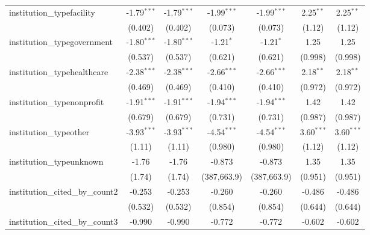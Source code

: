 \begin{tabular}{lcccccc}
   institution\_typefacility             & -1.79$^{***}$ & -1.79$^{***}$ & -1.99$^{***}$ & -1.99$^{***}$ & 2.25$^{**}$   & 2.25$^{**}$\\   
                                         & (0.402)       & (0.402)       & (0.073)       & (0.073)       & (1.12)        & (1.12)\\   
   institution\_typegovernment           & -1.80$^{***}$ & -1.80$^{***}$ & -1.21$^{*}$   & -1.21$^{*}$   & 1.25          & 1.25\\   
                                         & (0.537)       & (0.537)       & (0.621)       & (0.621)       & (0.998)       & (0.998)\\   
   institution\_typehealthcare           & -2.38$^{***}$ & -2.38$^{***}$ & -2.66$^{***}$ & -2.66$^{***}$ & 2.18$^{**}$   & 2.18$^{**}$\\   
                                         & (0.469)       & (0.469)       & (0.410)       & (0.410)       & (0.972)       & (0.972)\\   
   institution\_typenonprofit            & -1.91$^{***}$ & -1.91$^{***}$ & -1.94$^{***}$ & -1.94$^{***}$ & 1.42          & 1.42\\   
                                         & (0.679)       & (0.679)       & (0.731)       & (0.731)       & (0.987)       & (0.987)\\   
   institution\_typeother                & -3.93$^{***}$ & -3.93$^{***}$ & -4.54$^{***}$ & -4.54$^{***}$ & 3.60$^{***}$  & 3.60$^{***}$\\   
                                         & (1.11)        & (1.11)        & (0.980)       & (0.980)       & (1.12)        & (1.12)\\   
   institution\_typeunknown              & -1.76         & -1.76         & -0.873        & -0.873        & 1.35          & 1.35\\   
                                         & (1.74)        & (1.74)        & (387,663.9)   & (387,663.9)   & (0.951)       & (0.951)\\   
   institution\_cited\_by\_count2        & -0.253        & -0.253        & -0.260        & -0.260        & -0.486        & -0.486\\   
                                         & (0.532)       & (0.532)       & (0.854)       & (0.854)       & (0.644)       & (0.644)\\   
   institution\_cited\_by\_count3        & -0.990        & -0.990        & -0.772        & -0.772        & -0.602        & -0.602\\   

\end{tabular}
